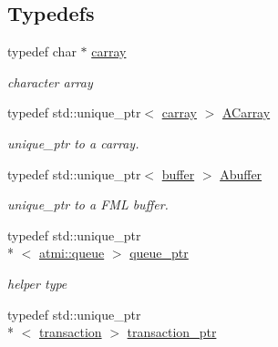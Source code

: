 \subsection*{Typedefs}
\begin{DoxyCompactItemize}
\item 
\hypertarget{group__fml_ga8b57f9a4e2453d8e5d82ac0016e35e87}{typedef char $\ast$ \hyperlink{group__fml_ga8b57f9a4e2453d8e5d82ac0016e35e87}{carray}}\label{group__fml_ga8b57f9a4e2453d8e5d82ac0016e35e87}

\begin{DoxyCompactList}\small\item\em character array \end{DoxyCompactList}\item 
\hypertarget{group__fml_ga095330dfead97321f0830e3fa204a24a}{typedef std\+::unique\+\_\+ptr$<$ \hyperlink{group__fml_ga8b57f9a4e2453d8e5d82ac0016e35e87}{carray} $>$ \hyperlink{group__fml_ga095330dfead97321f0830e3fa204a24a}{A\+Carray}}\label{group__fml_ga095330dfead97321f0830e3fa204a24a}

\begin{DoxyCompactList}\small\item\em unique\+\_\+ptr to a carray. \end{DoxyCompactList}\item 
\hypertarget{group__fml_gaa6276ba0b9cf18dd00fae53b1ce132f4}{typedef std\+::unique\+\_\+ptr$<$ \hyperlink{classatmi_1_1buffer}{buffer} $>$ \hyperlink{group__fml_gaa6276ba0b9cf18dd00fae53b1ce132f4}{Abuffer}}\label{group__fml_gaa6276ba0b9cf18dd00fae53b1ce132f4}

\begin{DoxyCompactList}\small\item\em unique\+\_\+ptr to a F\+M\+L buffer. \end{DoxyCompactList}\item 
\hypertarget{group__atmi_ga7cfd5961e0e05b148f12be311177a1a8}{typedef std\+::unique\+\_\+ptr\\*
$<$ \hyperlink{classatmi_1_1queue}{atmi\+::queue} $>$ \hyperlink{group__atmi_ga7cfd5961e0e05b148f12be311177a1a8}{queue\+\_\+ptr}}\label{group__atmi_ga7cfd5961e0e05b148f12be311177a1a8}

\begin{DoxyCompactList}\small\item\em helper type \end{DoxyCompactList}\item 
\hypertarget{group__atmi_gab8e359f2305eaf285b0b0745d3b41997}{typedef std\+::unique\+\_\+ptr\\*
$<$ \hyperlink{classatmi_1_1transaction}{transaction} $>$ \hyperlink{group__atmi_gab8e359f2305eaf285b0b0745d3b41997}{transaction\+\_\+ptr}}\label{group__atmi_gab8e359f2305eaf285b0b0745d3b41997}


\end{DoxyCompactItemize}
